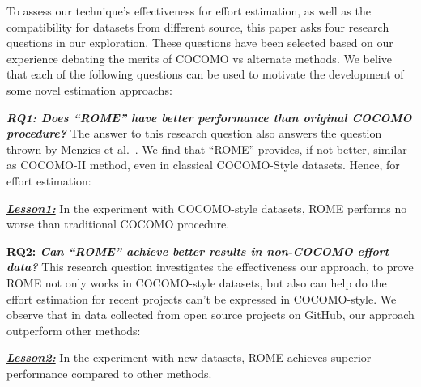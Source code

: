 \documentclass[sigconf,review,anonymous]{acmart}
\newenvironment{result}[2]
{\begin{myshadowbox}\textbf{\textit{\underline{Lesson#1:}}} #2}{ 
\end{myshadowbox}}
\begin{document}

To assess our technique's effectiveness for effort estimation, as well as the compatibility for datasets from different source, this paper asks four research questions in our exploration. These questions have been selected based on our experience debating the merits of COCOMO vs alternate methods. We belive that each of the following questions can be used to motivate the development of some  novel estimation approachs:


{\bf \em RQ1: Does ``ROME'' have better performance than original COCOMO procedure?} The answer to this research question also answers the question thrown by Menzies et al.~\cite{MenziesNeg:2017}. 
We find that ``ROME'' provides, if not better, similar as COCOMO-II method, even in classical COCOMO-Style datasets. Hence, for effort estimation:
 \begin{result}{1}
 In the experiment with COCOMO-style datasets, ROME performs no worse than traditional COCOMO procedure.
 \end{result}

{\bf RQ2: \em  Can ``ROME'' achieve better results in non-COCOMO effort data?}
 This research question investigates the effectiveness our approach, to prove ROME not only works in COCOMO-style datasets, but also can help  do the effort estimation for recent projects can't be expressed in COCOMO-style. We observe that in data collected from open source projects on GitHub, our approach outperform other methods:
 \begin{result}{2}
 In the experiment with new datasets, ROME achieves superior performance compared to other methods.
 \end{result}
 
\end{document}
